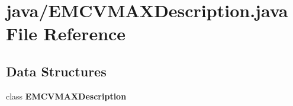 \section{java/\-E\-M\-C\-V\-M\-A\-X\-Description.java File Reference}
\label{EMCVMAXDescription_8java}
\subsection*{Data Structures}
\begin{DoxyCompactItemize}
\item 
class {\bf E\-M\-C\-V\-M\-A\-X\-Description}
\end{DoxyCompactItemize}
